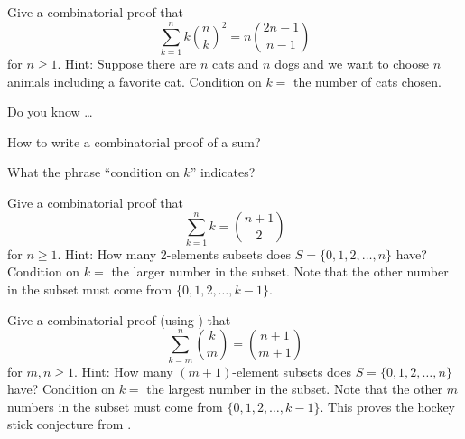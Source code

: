 \begin{exer}[\exerU] %
\label{exer_comb_pf_sum_weighted_binom_sq}
  Give a combinatorial proof that 
      $$ \sum_{k=1}^nk\binom{n}{k}^2 = n\binom{2n-1}{n-1}$$ 
    for $n \ge 1$. Hint:  Suppose there are $n$ cats and $n$ dogs and we want to choose $n$ animals including a favorite cat.  Condition on $k=$ the number of cats chosen.  
\end{exer}

\begin{exer}[\exerR] %
\label{exer_dyk_comb_pf_sums}
    Do you know \ldots
        \begin{exerpart}
            \item How to write a combinatorial proof of a sum?
            \item What the phrase ``condition on $k$'' indicates?
        \end{exerpart}
\end{exer}

\begin{exer}[\exerE] %
\label{exer_comb_pf_sum_hs}
    Give a combinatorial proof that 
        $$\sum_{k=1}^nk = \binom{n+1}{2}$$ 
    for $n \ge 1$. Hint:  How many 2-elements subsets does $S = \{0, 1, 2, \ldots, n\}$ have?  Condition on $k =$ the larger number in the subset.  Note that the other number in the subset must come from $\{0, 1, 2, \ldots, k-1\}$.  
\end{exer}

\begin{exer}[\exerE] %
\label{exer_comb_pf_sum_hockey_stick}
    Give a combinatorial proof (using ) that  
        $$\sum_{k=m}^n \binom{k}{m} = \binom{n+1}{m+1}$$
    for $m, n \ge 1$. Hint:  How many $(m+1)$-element subsets does $S = \{0, 1, 2, \ldots, n\}$ have?  Condition on $k =$ the largest number in the subset.  Note that the other $m$ numbers in the subset must come from $\{0, 1, 2, \ldots, k-1\}$.  This proves the hockey stick conjecture from .
\end{exer}

